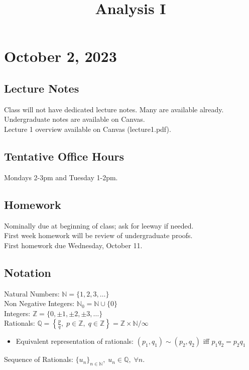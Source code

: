 \documentclass[11pt]{article}
\date{}
\title{Analysis I}
\newcommand{\0}{\emptyset}
\newcommand{\N}{\mathbb{N}}
\newcommand{\Z}{\mathbb{Z}}
\newcommand{\Q}{\mathbb{Q}}
\begin{document}
\maketitle
\section*{October 2, 2023}
\label{sec:org58c1467}
\subsection*{Lecture Notes}
\label{sec:org27a14e4}
Class will not have dedicated lecture notes. Many are available already.\\[0pt]
Undergraduate notes are available on Canvas.\\[0pt]
Lecture 1 overview available on Canvas (lecture1.pdf).\\[0pt]
\subsection*{Tentative Office Hours}
\label{sec:org39ab572}
Mondays 2-3pm and Tuesday 1-2pm.\\[0pt]
\subsection*{Homework}
\label{sec:org618a88a}
Nominally due at beginning of class; ask for leeway if needed.\\[0pt]
First week homework will be review of undergraduate proofs.\\[0pt]
First homework due Wednesday, October 11.\\[0pt]
\subsection*{Notation}
\label{sec:orga82828f}
Natural Numbers: \(\N=\{1,2,3,\ldots\}\)\\[0pt]
Non Negative Integers: \(\N_{0}=\N\cup\{0\}\)\\[0pt]
Integers: \(\Z=\{0,\pm1,\pm2,\pm3,\ldots\}\)\\[0pt]
Rationals: \(\Q=\left\{ \frac{p}{q},\;p\in\Z,\;q\in\Z \right\} = \Z\times\N/\infty\)\\[0pt]
\begin{itemize}
\item Equivalent representation of rationals: \((p_{1},q_{1})\sim(p_{2},q_{2})\) iff \(p_{1}q_{2}=p_{2}q_{1}\)\\[0pt]
\end{itemize}
Sequence of Rationals: \(\{u_{n}\}_{n\in\N},\;u_{n}\in\Q,\;\forall n\).\\[0pt]
\end{document}
